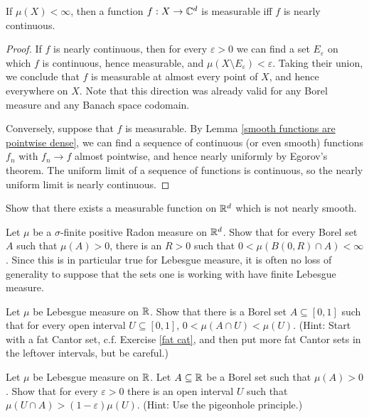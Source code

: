 \begin{theorem}[Luzin]
If $\mu(X) < \infty$, then a function $f: X \to \mathbb{C}^d$ is measurable iff $f$ is nearly continuous.
\end{theorem}
\begin{proof}
If $f$ is nearly continuous, then for every $\varepsilon > 0$ we can find a set $E_\varepsilon$ on which $f$ is continuous, hence measurable, and $\mu(X \setminus E_\varepsilon) < \varepsilon$.
Taking their union, we conclude that $f$ is measurable at almost every point of $X$, and hence everywhere on $X$.
Note that this direction was already valid for any Borel measure and any Banach space codomain.

Conversely, suppose that $f$ is measurable.
By Lemma \ref{smooth functions are pointwise dense}, we can find a sequence of continuous (or even smooth) functions $f_{n}$ with $f_{n} \to f$ almost pointwise, and hence nearly uniformly by Egorov's theorem.
The uniform limit of a sequence of functions is continuous, so the nearly uniform limit is nearly continuous.
\end{proof}

\begin{exercise}
Show that there exists a measurable function on $\mathbb{R}^d$ which is not nearly smooth.
\end{exercise}

\begin{exercise}
Let $\mu$ be a $\sigma$-finite positive Radon measure on $\mathbb{R}^d$.
Show that for every Borel set $A$ such that $\mu(A) > 0$, there is an $R > 0$ such that $0 < \mu(B(0, R) \cap A) < \infty$.
Since this is in particular true for Lebesgue measure, it is often no loss of generality to suppose that the sets one is working with have finite Lebesgue measure.
\end{exercise}

\begin{exercise}
Let $\mu$ be Lebesgue measure on $\mathbb{R}$.
Show that there is a Borel set $A \subseteq [0, 1]$ such that for every open interval $U \subseteq [0, 1]$, $0 < \mu(A \cap U) < \mu(U)$.
(Hint: Start with a fat Cantor set, c.f. Exercise \ref{fat cat}, and then put more fat Cantor sets in the leftover intervals, but be careful.)
\end{exercise}

\begin{exercise}
Let $\mu$ be Lebesgue measure on $\mathbb{R}$.
Let $A \subseteq \mathbb{R}$ be a Borel set such that $\mu(A) > 0$.
Show that for every $\varepsilon > 0$ there is an open interval $U$ such that $\mu(U \cap A) > (1 - \varepsilon)\mu(U)$.
(Hint: Use the pigeonhole principle.)
\end{exercise}

